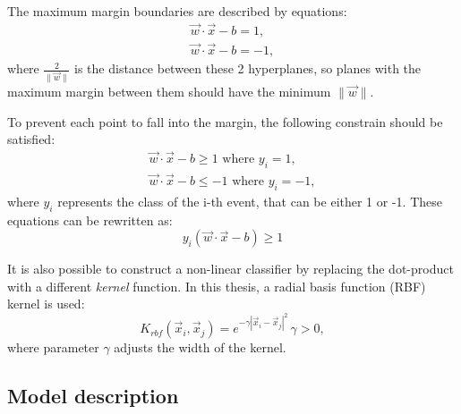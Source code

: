 The maximum margin boundaries are described by equations:
\begin{eqnarray}
\vec{w}\cdot \vec{x} - b = 1, \\
\vec{w}\cdot \vec{x} - b = -1,
\end{eqnarray}
where $\frac{2}{\|\vec{w}\|}$ is the distance between these 2 hyperplanes, so planes with the maximum margin between them should have the minimum $\|\vec{w}\|$. 

To prevent each point to fall into the margin, the following constrain should be satisfied: 
\begin{eqnarray}
\vec{w}\cdot \vec{x} - b \geqslant 1 \textrm{ where } y_i = 1,\\
\vec{w}\cdot \vec{x} - b \leqslant -1 \textrm{ where } y_i = -1,
\end{eqnarray}
where $y_i$ represents the class of the i-th event, that can be either 1 or -1. These equations can be rewritten as:
\begin{equation}
y_i(\vec{w}\cdot \vec{x} - b ) \geqslant 1
\end{equation}

It is also possible to construct a non-linear classifier by replacing the dot-product with a different \textit{kernel} function. In this thesis, a radial basis function (RBF) kernel is used:
\begin{equation}\label{eq:RBF}
K_{rbf}(\vec{x}_i, \vec{x}_j) = e^{-\gamma | \vec{x}_i - \vec{x}_j|^2} \, \gamma >0,
\end{equation}
where parameter $\gamma$ adjusts the width of the kernel.




\subsection{Model description}

\begin{figure}[!tbp]
\end{figure}

